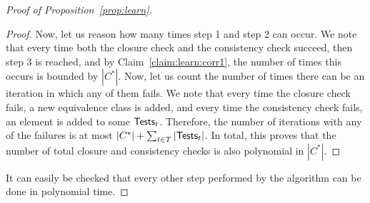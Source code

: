 \begin{toappendix}
\begin{proof}[Proof of Proposition~\ref{prop:learn}]
\begin{proof}
Now, let us reason how many times step 1 and step 2 can occur. We note that every time both the closure check and the consistency check succeed, then step 3 is reached, and by Claim~\ref{claim:learn:corr1}, the number of times this occurs is bounded by $|C^*|$. Now, let us count the number of times there can be an iteration in which any of them fails. We note that every time the closure check fails, a new equivalence class is added, and every time the consistency check fails, an element is added to some ${\sf Tests}_t$. Therefore, the number of iterations with any of the failures is at most $|C^*| + \sum_{t\in T}|{\sf Tests}_t|$. In total, this proves that the number of total closure and consistency checks is also polynomial in $|C^*|$.
\end{proof}

It can easily be checked that every other step performed by the algorithm can be done in polynomial time.
\end{proof}
\end{toappendix}

